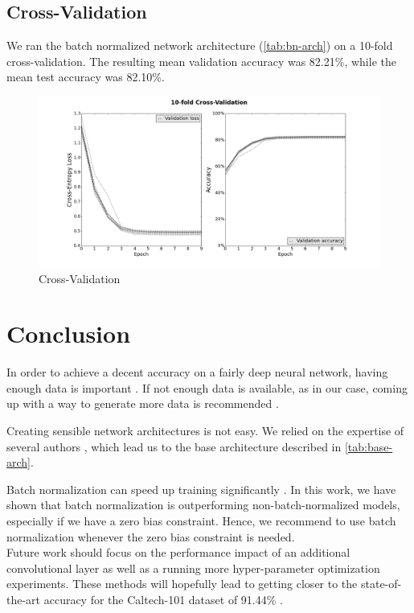 \documentclass[a4paper, 11pt]{article}
\begin{document}
\clearpage

\subsection{Cross-Validation} \label{sec:cv}

We ran the batch normalized network architecture (\cref{tab:bn-arch}) on a 10-fold cross-validation.
The resulting mean validation accuracy was 82.21\%, while the mean test accuracy was 82.10\%.

\begin{figure}[H]
	\includegraphics[width=\linewidth]{cross-val.png}
	\caption{Cross-Validation}
	\label{fig:cross-val}
\end{figure}


\section{Conclusion}
In order to achieve a decent accuracy on a fairly deep neural network, having enough data is important \cite{Domingos2014}.
If not enough data is available, as in our case, coming up with a way to generate more data is recommended \cite{Plankton2015}.

Creating sensible network architectures is not easy.
We relied on the expertise of several authors \cite{Simonyan2015,CS231nCNN}, which lead us to the base architecture described in \cref{tab:base-arch}.

Batch normalization can speed up training significantly \cite{Ioffe2015}.
In this work, we have shown that batch normalization is outperforming non-batch-normalized models, especially if we have a zero bias constraint.
Hence, we recommend to use batch normalization whenever the zero bias constraint is needed.\\


Future work should focus on the performance impact of an additional convolutional layer as well as a running more hyper-parameter optimization experiments.
These methods will hopefully lead to getting closer to the state-of-the-art accuracy for the Caltech-101 dataset of 91.44\% \cite{He2014}.
\end{document}
